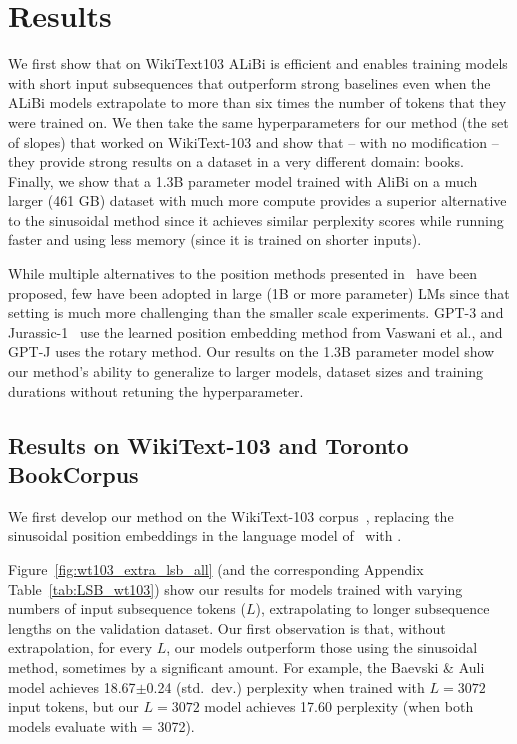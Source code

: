 \section{Results}
\label{sec:results}
We first show that on WikiText103 ALiBi is efficient and enables training models with short input subsequences that outperform strong baselines even when the ALiBi models extrapolate to more than six times the number of tokens that they were trained on. 
We then take the same hyperparameters for our method (the set of slopes) that worked on WikiText-103 and show that -- with no modification -- they provide strong results on a dataset in a very different domain: books. 
Finally, we show that a 1.3B parameter model trained with AliBi on a much larger (461 GB) dataset with much more compute provides a superior alternative to the sinusoidal method since it achieves similar perplexity scores while running faster and using less memory (since it is trained on shorter inputs). 

While multiple alternatives to the position methods presented in~\cite{vaswani} have been proposed, few have been adopted in large (1B or more parameter) LMs since  that setting is much more challenging than the smaller scale experiments. GPT-3 and Jurassic-1~\citep{J1WhitePaper} use the learned position embedding method from Vaswani et al., and GPT-J uses the rotary method.
Our results on the 1.3B parameter model show our method's ability to generalize to larger models, dataset sizes and training durations without retuning the hyperparameter. 


\subsection{Results on WikiText-103 and Toronto BookCorpus}



We first develop our method on the WikiText-103 corpus~\citep{pointer}, replacing the sinusoidal position embeddings in the language model of~\cite{baevski} with \al. 


Figure~\ref{fig:wt103_extra_lsb_all} (and the corresponding Appendix Table~\ref{tab:LSB_wt103}) show our results for models trained with varying numbers of input subsequence tokens ($L$), extrapolating to longer subsequence lengths on the validation dataset. 
Our first observation is that, without extrapolation, for every $L$, our models outperform  those using the sinusoidal method, sometimes by a  significant %
amount. For example, the Baevski \& Auli model achieves 18.67$\pm$0.24 (std.~dev.) perplexity when trained with $L = 3072$ input tokens, but our $L=3072$ model achieves 17.60 perplexity (when both models evaluate with \li = 3072).

